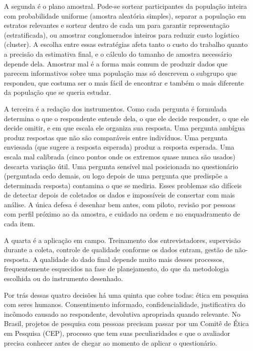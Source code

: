 \documentclass[12pt, a4paper, openany]{book}
\begin{document}
A segunda é o plano amostral. Pode-se sortear participantes da população
inteira com probabilidade uniforme (amostra aleatória simples), separar
a população em estratos relevantes e sortear dentro de cada um para
garantir representação (estratificada), ou amostrar conglomerados
inteiros para reduzir custo logístico (cluster). A escolha entre essas
estratégias afeta tanto o custo do trabalho quanto a precisão da
estimativa final, e o cálculo do tamanho de amostra necessário depende
dela. Amostrar mal é a forma mais comum de produzir dados que parecem
informativos sobre uma população mas só descrevem o subgrupo que
respondeu, que costuma ser o mais fácil de encontrar e também o mais
diferente da população que se queria estudar.

A terceira é a redação dos instrumentos. Como cada pergunta é formulada
determina o que o respondente entende dela, o que ele decide responder, o
que ele decide omitir, e em que escala ele organiza sua resposta. Uma
pergunta ambígua produz respostas que não são comparáveis entre
indivíduos. Uma pergunta enviesada (que sugere a resposta esperada)
produz a resposta esperada. Uma escala mal calibrada (cinco pontos onde
os extremos quase nunca são usados) descarta variação útil. Uma pergunta
sensível mal posicionada no questionário (perguntada cedo demais, ou logo
depois de uma pergunta que predispõe a determinada resposta) contamina o
que se mediria. Esses problemas são difíceis de detectar depois de
coletados os dados e impossíveis de consertar com mais análise. A única
defesa é desenhar bem antes, com piloto, revisão por pessoas com perfil
próximo ao da amostra, e cuidado na ordem e no enquadramento de cada
item.

A quarta é a aplicação em campo. Treinamento dos entrevistadores,
supervisão durante a coleta, controle de qualidade conforme os dados
entram, gestão de não-resposta. A qualidade do dado final depende muito
mais desses processos, frequentemente esquecidos na fase de planejamento,
do que da metodologia escolhida ou do instrumento desenhado.

Por trás dessas quatro decisões há uma quinta que cobre todas: ética em
pesquisa com seres humanos. Consentimento informado, confidencialidade,
justificativa do incômodo causado ao respondente, devolutiva apropriada
quando relevante. No Brasil, projetos de pesquisa com pessoas precisam
passar por um Comitê de Ética em Pesquisa (CEP), processo que tem suas
peculiaridades e que o avaliador precisa conhecer antes de chegar ao
momento de aplicar o questionário.
\end{document}

